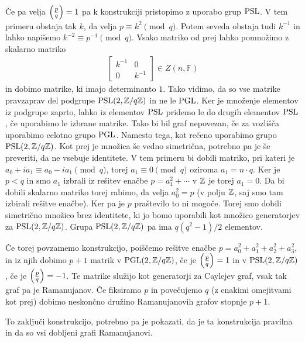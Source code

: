 Če pa velja \(\left(\frac{p}{q}\right) = 1\) pa k konstrukciji pristopimo z uporabo grup \(\operatorname{PSL}\). V tem primeru obstaja tak \(k\), da velja \(p\equiv k^2 \pmod q\). Potem seveda obstaja tudi \(k^{-1}\) in lahko napišemo \(k^{-2} \equiv p^{-1}\pmod q\). Vsako matriko od prej lahko pomnožimo z skalarno matriko
\begin{align*}
    \begin{bmatrix}
        k^{-1} & 0 \\
        0 & k^{-1}
    \end{bmatrix}\in Z(n, \mathbb F)
\end{align*}
in dobimo matrike, ki imajo determinanto \(1\). Tako vidimo, da so vse matrike pravzaprav del podgrupe \(\operatorname{PSL}(2, \mathbb Z/q\mathbb Z)\) in ne le \(\operatorname{PGL}\). Ker je množenje elementov iz podgrupe zaprto, lahko iz elementov \(\operatorname{PSL}\) pridemo le do drugih elementov \(\operatorname{PSL}\), če uporabimo le izbrane matrike. Tako bi bil graf nepovezan, če za vozlišča uporabimo celotno grupo \(\operatorname{PGL}\). Namesto tega, kot rečeno uporabimo grupo \(\operatorname{PSL}(2, \mathbb Z/q\mathbb Z)\). Kot prej je množica še vedno simetrična, potrebno pa je še preveriti, da ne vsebuje identitete. V tem primeru bi dobili matriko, pri kateri je \(a_0 +ia_1 \equiv a_0 - ia_1 \pmod q\), torej \(a_1 \equiv 0 \pmod q\) oziroma \(a_1 = n\cdot q\). Ker je \(p<q\) in smo \(a_1\) izbrali iz rešitev enačbe \(p=a_1^2 + \cdots\) v \(\mathbb Z\) je torej \(a_1=0\). Da bi dobili skalarno matriko torej rabimo, da velja \(a_0^2 = p\) (v polju \(\mathbb Z\), saj smo tam izbirali rešitve enačbe). Ker pa je \(p\) praštevilo to ni mogoče. Torej smo dobili simetrično množico brez identitete, ki jo bomo uporabili kot množico generatorjev za \(\operatorname{PSL}(2, \mathbb Z/q\mathbb Z)\). Grupa \(\operatorname{PSL}(2, \mathbb Z/q\mathbb Z)\) pa ima \(q(q^2-1)/2\) elementov.

Če torej povzamemo konstrukcijo, poiščemo rešitve enačbe \(p = a_0^2 + a_1^2 + a_2^2 + a_3^2\), in iz njih dobimo \(p+1\) matrik v \(\operatorname{PGL}(2, \mathbb Z/q\mathbb Z)\), če je \(\left(\frac{p}{q}\right)=1\) in v \(\operatorname{PSL}(2, \mathbb Z/q\mathbb Z)\), če je \(\left(\frac{p}{q}\right)=-1\). Te matrike služijo kot generatorji za Caylejev graf, vsak tak graf pa je Ramanujanov. Če fiksiramo \(p\) in povečujemo \(q\) (z enakimi omejitvami kot prej) dobimo neskončno družino Ramanujanovih grafov stopnje \(p+1\).

To zaključi konstrukcijo, potrebno pa je pokazati, da je ta konstrukcija pravilna in da so vsi dobljeni grafi Ramanujanovi.
